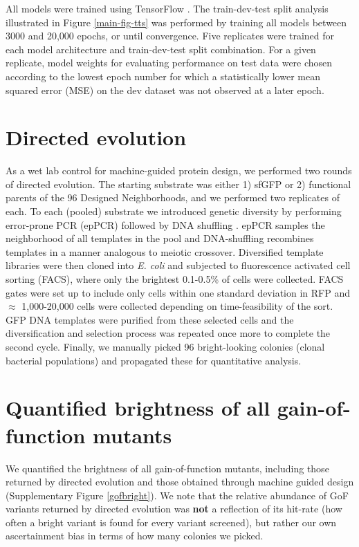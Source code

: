 All models were trained using TensorFlow \cite{abadi2016tensorflow}. The train-dev-test split analysis illustrated in Figure \ref{main-fig-tts} was performed by training all models between 3000 and 20,000 epochs, or until convergence. Five replicates were trained for each model architecture and train-dev-test split combination. For a given replicate, model weights for evaluating performance on test data were chosen according to the lowest epoch number for which a statistically lower mean squared error (MSE) on the dev dataset was not observed at a later epoch.

\section{Directed evolution} \label{sec:devol}

As a wet lab control for machine-guided protein design, we performed two rounds of directed evolution. The starting substrate was either 1) sfGFP or 2) functional parents of the 96 Designed Neighborhoods, and we performed two replicates of each. To each (pooled) substrate we introduced genetic diversity by performing error-prone PCR (epPCR) followed by DNA shuffling \cite{arnold2003directed}. epPCR samples the neighborhood of all templates in the pool and DNA-shuffling recombines templates in a manner analogous to meiotic crossover. Diversified template libraries were then cloned into \emph{E. coli} and subjected to fluorescence activated cell sorting (FACS), where only the brightest 0.1-0.5\% of cells were collected. FACS gates were set up to include only cells within one standard deviation in RFP and $\approx$ 1,000-20,000 cells were collected depending on time-feasibility of the sort. GFP DNA templates were purified from these selected cells and the diversification and selection process was repeated once more to complete the second cycle. Finally, we manually picked 96 bright-looking colonies (clonal bacterial populations) and propagated these for quantitative analysis. 

\section{Quantified brightness of all gain-of-function mutants}

We quantified the brightness of all gain-of-function mutants, including those returned by directed evolution and those obtained through machine guided design (Supplementary Figure \ref{gofbright}). We note that the relative abundance of GoF variants returned by directed evolution was \textbf{not} a reflection of its hit-rate (how often a bright variant is found for every variant screened), but rather our own ascertainment bias in terms of how many colonies we picked.

